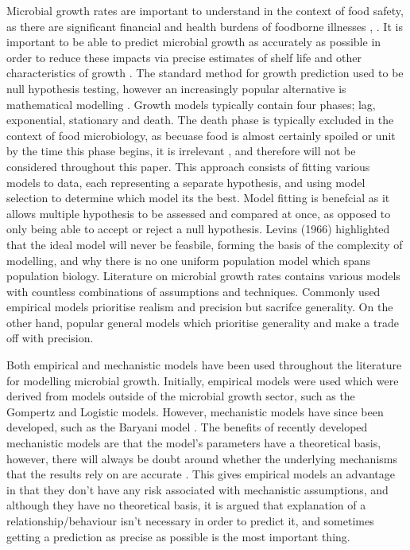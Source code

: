 \documentclass[11pt, titlepage]{article}
\begin{document}
    Microbial growth rates are important to understand in the context of food safety, as there are significant financial and health burdens of foodborne illnesses \cite{daniel2020burden}, \cite{world2015estimates}. It is important to be able to predict microbial growth as accurately as possible in order to reduce these impacts via precise estimates of shelf life and other characteristics of growth \cite{mcmeekin1996shelf}. The standard method for growth prediction used to be null hypothesis testing, however an increasingly popular alternative is mathematical modelling \cite{foegeding1997driving}. Growth models typically contain four phases; lag, exponential, stationary and death. The death phase is typically excluded in the context of food microbiology, as becuase food is almost certainly spoiled or unit by the time this phase begins, it is irrelevant \cite{ross2003modeling}, and therefore will not be considered throughout this paper. This approach consists of fitting various models to data, each representing a separate hypothesis, and using model selection to determine which model its the best. Model fitting is benefcial as it allows multiple hypothesis to be assessed and compared at once, as opposed to only being able to accept or reject a null hypothesis. Levins (1966) highlighted that the ideal model will never be feasbile, forming the basis of the complexity of modelling, and why there is no one uniform population model which spans population biology. Literature on microbial growth rates contains various models with countless combinations of assumptions and techniques. Commonly used empirical models prioritise realism and precision but sacrifce generality. On the other hand, popular general models which prioritise generality and make a trade off with precision.
    
    Both empirical and mechanistic models have been used throughout the literature for modelling microbial growth. Initially, empirical models were used which were derived from models outside of the microbial growth sector, such as the Gompertz and Logistic models. However, mechanistic models have since been developed, such as the Baryani model \cite{grijspeerdt1999estimating}. The benefits of recently developed mechanistic models are that the model's parameters have a theoretical basis, however, there will always be doubt around whether the underlying mechanisms that the results rely on are accurate \cite{lopez2004statistical}. This gives empirical models an advantage in that they don't have any risk associated with mechanistic assumptions, and although they have no theoretical basis, it is argued that explanation of a relationship/behaviour isn't necessary in order to predict it, and sometimes getting a prediction as precise as possible is the most important thing.
    
\end{document}
